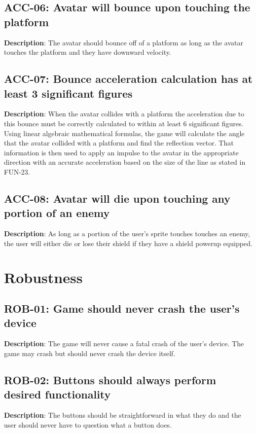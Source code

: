 \subsection{ACC-06: Avatar will bounce upon touching the platform}
\textbf{Description}: The avatar should bounce off of a platform as long as
the avatar touches the platform and they have downward velocity.

\subsection{ACC-07: Bounce acceleration calculation has at least 3 significant figures}
\textbf{Description}: When the avatar collides with a platform the acceleration
due to this bounce must be correctly calculated to within at least
6 significant figures. Using linear algebraic mathematical formulas,
the game will calculate the angle that the avatar collided with a
platform and find the reflection vector. That information is then
used to apply an impulse to the avatar in the appropriate direction
with an accurate acceleration based on the size of the line as stated
in FUN-23.

\subsection{ACC-08: Avatar will die upon touching any portion of an enemy}
\textbf{Description}: As long as a portion of the user\textquoteright{}s sprite
touches touches an enemy, the user will either die or lose their shield
if they have a shield powerup equipped.

\section{Robustness}

\subsection{ROB-01: Game should never crash the user\textquoteright{}s device}
\textbf{Description}: The game will never cause a fatal crash of the user\textquoteright{}s
device. The game may crash but should never crash the device itself.

\subsection{ROB-02: Buttons should always perform desired functionality}
\textbf{Description}: The buttons should be straightforward in what they do
and the user should never have to question what a button does.

